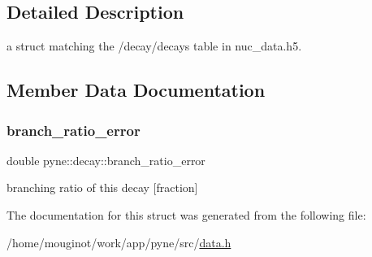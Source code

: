 \subsection{Detailed Description}
a struct matching the \textquotesingle{}/decay/decays\textquotesingle{} table in nuc\+\_\+data.\+h5. 

\subsection{Member Data Documentation}
\mbox{\label{structpyne_1_1decay_a6df2be5724d68bfe566b53fa71320812}} 
\subsubsection{\texorpdfstring{branch\+\_\+ratio\+\_\+error}{branch\_ratio\_error}}
{\footnotesize\ttfamily double pyne\+::decay\+::branch\+\_\+ratio\+\_\+error}

branching ratio of this decay \mbox{[}fraction\mbox{]} 

The documentation for this struct was generated from the following file\+:\begin{DoxyCompactItemize}
\item 
/home/mouginot/work/app/pyne/src/\hyperlink{data_8h}{data.\+h}\end{DoxyCompactItemize}
